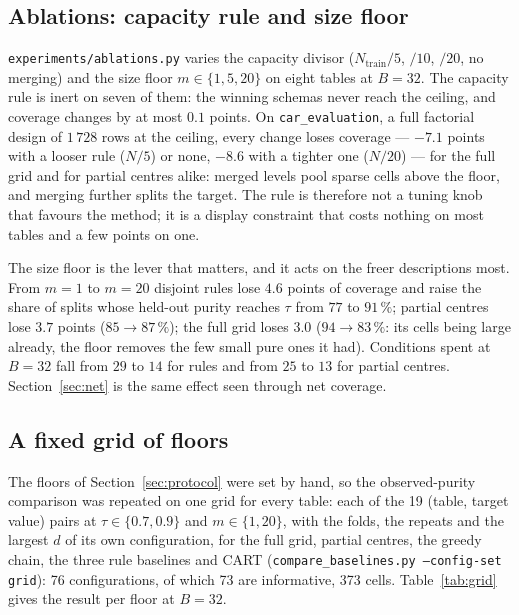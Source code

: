 \documentclass[11pt]{article}
\begin{document}
\subsection{Ablations: capacity rule and size floor}\label{sec:ablation}
\texttt{experiments/ablations.py} varies the capacity divisor ($N_{\mathrm{train}}/5$, $/10$, $/20$, no merging) and the size floor $m\in\{1,5,20\}$ on eight tables at $B=32$. The capacity rule is inert on seven of them: the winning schemas never reach the ceiling, and coverage changes by at most $0.1$ points. On \texttt{car\_evaluation}, a full factorial design of $1\,728$ rows at the ceiling, every change loses coverage --- $-7.1$ points with a looser rule ($N/5$) or none, $-8.6$ with a tighter one ($N/20$) --- for the full grid and for partial centres alike: merged levels pool sparse cells above the floor, and merging further splits the target. The rule is therefore not a tuning knob that favours the method; it is a display constraint that costs nothing on most tables and a few points on one.

The size floor is the lever that matters, and it acts on the freer descriptions most. From $m=1$ to $m=20$ disjoint rules lose $4.6$ points of coverage and raise the share of splits whose held-out purity reaches $\tau$ from $77$ to $91\,\%$; partial centres lose $3.7$ points ($85\to87\,\%$); the full grid loses $3.0$ ($94\to83\,\%$: its cells being large already, the floor removes the few small pure ones it had). Conditions spent at $B=32$ fall from $29$ to $14$ for rules and from $25$ to $13$ for partial centres. Section~\ref{sec:net} is the same effect seen through net coverage.

\subsection{A fixed grid of floors}\label{sec:grid}
The floors of Section~\ref{sec:protocol} were set by hand, so the observed-purity comparison was repeated on one grid for every table: each of the 19 (table, target value) pairs at $\tau\in\{0.7,0.9\}$ and $m\in\{1,20\}$, with the folds, the repeats and the largest $d$ of its own configuration, for the full grid, partial centres, the greedy chain, the three rule baselines and CART (\texttt{compare\_baselines.py --config-set grid}): 76 configurations, of which 73 are informative, 373 cells. Table~\ref{tab:grid} gives the result per floor at $B=32$.

\begin{table}[t]\centering\small\setlength{\tabcolsep}{3.5pt}
\caption{The observed-purity comparison on one fixed grid of floors, $B=32$: informative configurations $n$; marks ($|t|\ge2$) of partial centres (part.) and of the full grid against free disjoint rules (rules); means over configurations of held-out coverage and net coverage, in points, and of the share of splits whose held-out union reaches $\tau$, for the full grid, partial centres and disjoint rules. Generated by \texttt{experiments/paper\_tables.py} from \texttt{pairwise\_grid.csv}.}\label{tab:grid}

\end{table}
\end{document}
